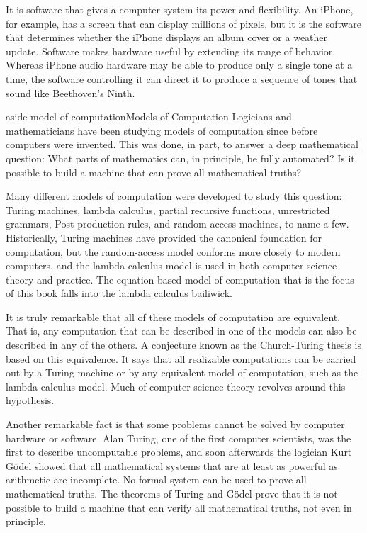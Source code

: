 It is software that gives a computer system its power and flexibility.
An iPhone, for example, has a screen that
can display millions of pixels,
but it is the software that determines whether the
iPhone displays an album cover or a weather update.
Software makes hardware useful by extending its range of behavior.
Whereas iPhone audio hardware may be able to produce
only a single tone at a time, the software controlling it
can direct it to produce a sequence of tones
that sound like Beethoven's Ninth.

\begin{aside}{aside-model-of-computation}{Models of Computation}
Logicians and mathematicians have been studying
models of computation
since before computers were invented. This was done, in part, to
answer a deep mathematical question: What parts of mathematics can,
in principle, be fully automated?  Is it possible to
build a machine that can prove all mathematical truths?

Many different models of computation were developed to study this question:
Turing machines, lambda calculus,
partial recursive functions,
unrestricted grammars, Post production rules, and random-access machines,
to name a few.
Historically, Turing machines have provided the canonical foundation for computation,
but the random-access model conforms more closely to modern computers,
and the lambda calculus model is used in both computer science theory and practice.
The equation-based model of computation that is the focus of this book
falls into the lambda calculus bailiwick.

It is truly remarkable that all of these models of
computation are equivalent.  That is,
any computation that can be described in one of the models can
also be described in any of the others.
A conjecture known as the Church-Turing thesis
is based on this equivalence.
It says that all realizable computations can
be carried out by a Turing machine or by
any equivalent model of computation, such as
the lambda-calculus model.
Much of computer science theory
revolves around this hypothesis.

Another remarkable fact is that some problems cannot be solved
by computer hardware or software.
Alan Turing, one of the first computer scientists,
was the first to describe
uncomputable problems,
and soon afterwards the logician Kurt G\"odel
showed that all mathematical systems that are at least as
powerful as arithmetic
are incomplete. No formal system can be used
to prove all mathematical truths.
The theorems of Turing and G\"odel
prove that it is not possible to build a machine that can verify all mathematical
truths, not even in principle.
\end{aside}

